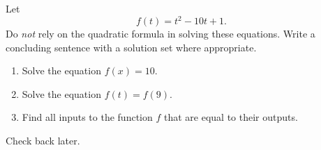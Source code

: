 \documentclass{ximera}
\begin{document}
\begin{question}  \label{Qsdfsdftiii}
Let 
\[
        f(t) = t^2 - 10t + 1 .
\]
Do \emph{not} rely on the quadratic formula in solving these equations. Write a concluding sentence with a solution set where appropriate.
\begin{enumerate}
\item Solve the equation $f(x) = 10$.

\item Solve the equation $f(t) = f(9)$.

\item Find all inputs to the function $f$ that are equal to their outputs.
\end{enumerate}
\end{question}

\begin{question}  \label{Qgrg54t4t4tr}
Check back later.
\end{question}
\end{document}
